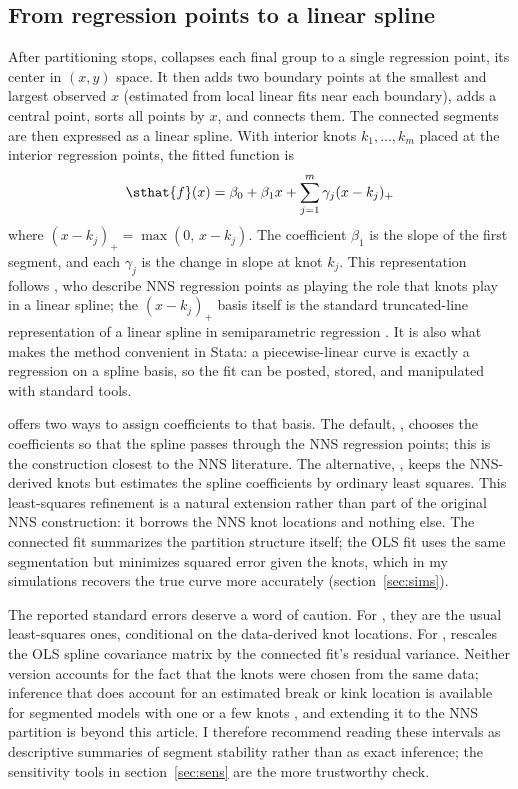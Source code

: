 \subsection{From regression points to a linear spline}

After partitioning stops,  collapses each final group to a
single regression point, its center in $(x, y)$ space.  It then adds two
boundary points at the smallest and largest observed $x$ (estimated from
local linear fits near each boundary), adds a central point, sorts all points
by $x$, and connects them.  The connected segments are then expressed as a
linear spline.  With interior knots $k_1,\ldots,k_m$ placed at the interior
regression points, the fitted function is
\[
  \sthat{f}(x) = \beta_0 + \beta_1 x +
    \sum_{j=1}^{m} \gamma_j (x-k_j)_+
\]
where $(x-k_j)_+=\max(0,\,x-k_j)$.  The coefficient $\beta_1$ is the slope of
the first segment, and each $\gamma_j$ is the change in slope at knot $k_j$.
This representation follows \citet{vinod_viole_2018_segments}, who describe
NNS regression points as playing the role that knots play in a linear
spline; the $(x-k_j)_+$ basis itself is the standard truncated-line
representation of a linear spline in semiparametric regression
\citep{ruppert_wand_carroll_2003}.  It is also what makes the method
convenient in Stata: a
piecewise-linear curve is exactly a regression on a spline basis, so the fit
can be posted, stored, and manipulated with standard tools.

 offers two ways to assign coefficients to that basis.  The
default, , chooses the coefficients so that the spline
passes through the NNS regression points; this is the construction closest to
the NNS literature.  The alternative, , keeps the
NNS-derived knots but estimates the spline coefficients by ordinary least
squares.  This least-squares refinement is a natural extension rather than
part of the original NNS construction: it borrows the NNS knot locations and
nothing else.  The
connected fit summarizes the partition structure itself; the OLS fit uses the
same segmentation but minimizes squared error given the knots, which in my
simulations recovers the true curve more accurately (section~\ref{sec:sims}).

The reported standard errors deserve a word of caution.  For
, they are the usual least-squares ones, conditional on
the data-derived knot locations.  For , 
rescales the OLS spline covariance matrix by the connected fit's residual
variance.  Neither version accounts for the fact that the knots were chosen
from the same data; inference that does account for an estimated break or
kink location is available for segmented models with one or a few knots
\citep{muggeo_2003,hansen_2017_kink}, and extending it to the NNS partition
is beyond this article.  I therefore recommend reading these intervals as
descriptive summaries of segment stability rather than as exact inference;
the sensitivity tools in section~\ref{sec:sens} are the more trustworthy
check.

